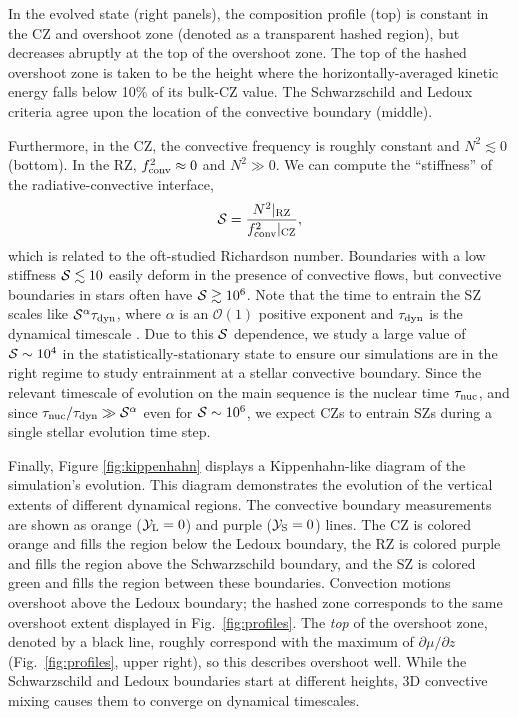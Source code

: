 In the evolved state (right panels), the composition profile (top) is constant in the CZ and overshoot zone (denoted as a transparent hashed region), but decreases abruptly at the top of the overshoot zone.
The top of the hashed overshoot zone is taken to be the height where the horizontally-averaged kinetic energy falls below 10\% of its bulk-CZ value.
The Schwarzschild and Ledoux criteria agree upon the location of the convective boundary (middle).

Furthermore, in the CZ, the convective frequency is roughly constant and $N^2 \lesssim 0$ (bottom).
In the RZ, $f_{\rm{conv}}^2 \approx 0$ and $N^2 \gg 0$.
We can compute the ``stiffness'' of the radiative-convective interface,
\begin{equation}
\mS = \frac{N^2|_{\rm{RZ}}}{f_{\rm{conv}}^2|_{\rm{CZ}}},
\label{eqn:stiffness}
\end{equation}
which is related to the oft-studied Richardson number.
Boundaries with a low stiffness $\mathcal{S} \lesssim 10$ easily deform in the presence of convective flows, but convective boundaries in stars often have $\mathcal{S} \gtrsim 10^6$.
Note that the time to entrain the SZ scales like $\mathcal{S}^{\alpha}\tau_{\rm{dyn}}$, where $\alpha$ is an $\mathcal{O}(1)$ positive exponent and $\tau_{\rm{dyn}}$ is the dynamical timescale \citep{turner_1968, fuentes_cumming_2020}.
Due to this $\mathcal{S}$ dependence, we study a large value of $\mathcal{S} \sim 10^{4}$ in the statistically-stationary state to ensure our simulations are in the right regime to study entrainment at a stellar convective boundary.
Since the relevant timescale of evolution on the main sequence is the nuclear time $\tau_{\rm{nuc}}$, and since $\tau_{\rm{nuc}}/\tau_{\rm{dyn}} \gg \mathcal{S}^{\alpha}$ even for $\mathcal{S} \sim 10^6$, we expect CZs to entrain SZs during a single stellar evolution time step.

Finally, Figure \ref{fig:kippenhahn} displays a Kippenhahn-like diagram of the simulation's evolution.
This diagram demonstrates the evolution of the vertical extents of different dynamical regions.
The convective boundary measurements are shown as orange ($\mathcal{Y}_{\rm{L}} = 0$) and purple ($\mathcal{Y}_{\rm{S}} = 0$) lines.
The CZ is colored orange and fills the region below the Ledoux boundary, the RZ is colored purple and fills the region above the Schwarzschild boundary, and the SZ is colored green and fills the region between these boundaries.
Convection motions overshoot above the Ledoux boundary; the hashed zone corresponds to the same overshoot extent displayed in Fig.~\ref{fig:profiles}.
The \emph{top} of the overshoot zone, denoted by a black line, roughly correspond with the maximum of $\partial\mu/\partial z$ (Fig.~\ref{fig:profiles}, upper right), so this describes overshoot well.
While the Schwarzschild and Ledoux boundaries start at different heights, 3D convective mixing causes them to converge on dynamical timescales.


